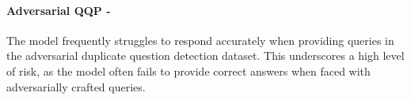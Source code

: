 \paragraph{Adversarial QQP - \high}
The model frequently struggles to respond accurately when providing queries in the adversarial duplicate question detection dataset. This underscores a high level of risk, as the model often fails to provide correct answers when faced with adversarially crafted queries.

